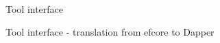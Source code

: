 \begin{figure}[!htp]
  \centering
  \caption{Tool interface}
  \label{fig:tool_interface}
\end{figure}

\begin{landscape}
\begin{figure}[!htp]
  \centering
  \caption{Tool interface - translation from \acrshort{efcore} to Dapper}
  \label{fig:tool_interface_translated}
\end{figure}
\end{landscape}